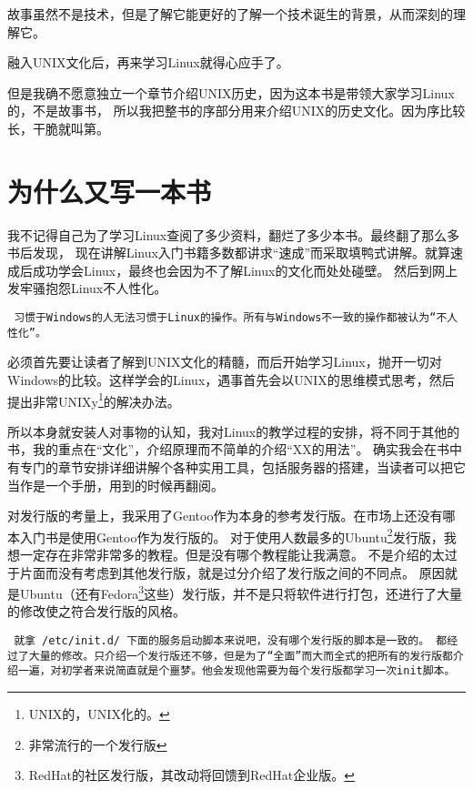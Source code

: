 \documentclass[amstex]{ctexbook}
\newenvironment{notice}{\tt}{}
\begin{document}
故事虽然不是技术，但是了解它能更好的了解一个技术诞生的背景，从而深刻的理解它。

融入UNIX文化后，再来学习Linux就得心应手了。

但是我确不愿意独立一个章节介绍UNIX历史，因为这本书是带领大家学习Linux的，不是故事书，
所以我把整书的序部分用来介绍UNIX的历史文化。因为序比较长，干脆就叫第。

\section{为什么又写一本书}



我不记得自己为了学习Linux查阅了多少资料，翻烂了多少本书。最终翻了那么多书后发现，
现在讲解Linux入门书籍多数都讲求“速成”而采取填鸭式讲解。就算速成后成功学会Linux，最终也会因为不了解Linux的文化而处处碰壁。
然后到网上发牢骚抱怨Linux不人性化。

\begin{notice}
习惯于Windows的人无法习惯于Linux的操作。所有与Windows不一致的操作都被认为“不人性化”。
\end{notice}

必须首先要让读者了解到UNIX文化的精髓，而后开始学习Linux，抛开一切对Windows的比较。这样学会的Linux，遇事首先会以UNIX的思维模式思考，然后提出非常UNIXy\footnote{UNIX的，UNIX化的。}的解决办法。

所以本身就安装人对事物的认知，我对Linux的教学过程的安排，将不同于其他的书，我的重点在“文化”，介绍原理而不简单的介绍“XX的用法”。
确实我会在书中有专门的章节安排详细讲解个各种实用工具，包括服务器的搭建，当读者可以把它当作是一个手册，用到的时候再翻阅。

对发行版的考量上，我采用了Gentoo作为本身的参考发行版。在市场上还没有哪本入门书是使用Gentoo作为发行版的。
对于使用人数最多的Ubuntu\footnote{非常流行的一个发行版}发行版，我想一定存在非常非常多的教程。但是没有哪个教程能让我满意。
不是介绍的太过于片面而没有考虑到其他发行版，就是过分介绍了发行版之间的不同点。
原因就是Ubuntu（还有Fedora\footnote{RedHat的社区发行版，其改动将回馈到RedHat企业版。}这些）发行版，并不是只将软件进行打包，还进行了大量的修改使之符合发行版的风格。

\begin{notice}
就拿 /etc/init.d/ 下面的服务启动脚本来说吧，没有哪个发行版的脚本是一致的。
都经过了大量的修改。只介绍一个发行版还不够，但是为了“全面”而大而全式的把所有的发行版都介绍一遍，对初学者来说简直就是个噩梦。他会发现他需要为每个发行版都学习一次init脚本。
\end{notice}
\end{document}
